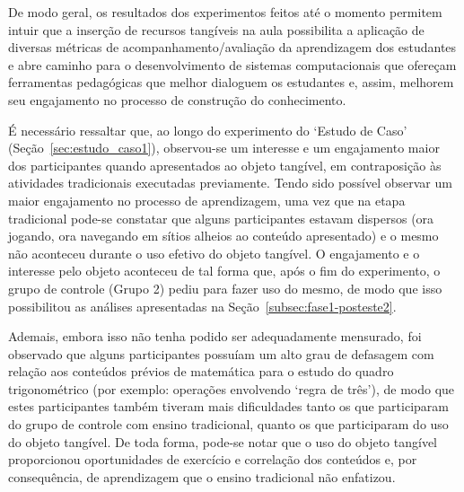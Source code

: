 
De modo geral, os resultados dos experimentos feitos até o momento permitem intuir que a inserção de recursos tangíveis na aula possibilita a aplicação de diversas métricas de acompanhamento/avaliação da aprendizagem dos estudantes e abre caminho para o desenvolvimento de sistemas computacionais %
que ofereçam %
ferramentas pedagógicas que melhor dialoguem os estudantes e, assim, melhorem seu engajamento no processo de construção do conhecimento.

É necessário ressaltar que, ao longo do experimento do `Estudo de Caso' (Seção~\ref{sec:estudo_caso1}), observou-se um interesse e um engajamento maior dos participantes quando apresentados ao objeto tangível, em contraposição às atividades tradicionais executadas previamente. Tendo sido possível observar um maior engajamento no processo de aprendizagem, uma vez que na etapa tradicional pode-se constatar que alguns participantes estavam dispersos (ora jogando, ora navegando em sítios alheios ao conteúdo apresentado) e o mesmo não aconteceu durante o uso efetivo do objeto tangível. O engajamento e o interesse pelo objeto aconteceu de tal forma que, após o fim do experimento, o grupo de controle (Grupo 2) pediu para fazer uso do mesmo, de modo que isso possibilitou as análises apresentadas na Seção~\ref{subsec:fase1-posteste2}.

Ademais, embora isso não tenha podido ser adequadamente mensurado, foi observado que alguns participantes possuíam um alto grau de defasagem com relação aos conteúdos prévios de matemática para o estudo do quadro trigonométrico (por exemplo: operações envolvendo `regra de três'), de modo que estes participantes também tiveram mais dificuldades tanto os que participaram do grupo de controle com ensino tradicional, quanto os que participaram do uso do objeto tangível. De toda forma, pode-se notar que o uso do objeto tangível proporcionou oportunidades de exercício e correlação dos conteúdos e, por consequência, de aprendizagem que o ensino tradicional não enfatizou.

